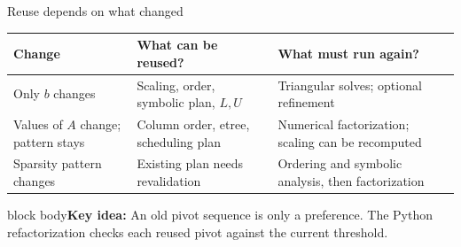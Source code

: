 \documentclass[aspectratio=169,10pt]{beamer}
\newcommand{\takeaway}[1]{\vfill\begin{beamercolorbox}[sep=7pt,wd=\textwidth]{block body}\small\textbf{Key idea:} #1\end{beamercolorbox}}
\begin{document}
\begin{frame}{Reuse depends on what changed}
\centering
\begin{tabular}{@{}p{3.5cm}p{4.9cm}p{4.9cm}@{}}
\toprule
\textbf{Change} & \textbf{What can be reused?} & \textbf{What must run again?}\\
\midrule
Only $b$ changes & Scaling, order, symbolic plan, $L,U$ & Triangular solves; optional refinement\\[9pt]
Values of $A$ change; pattern stays & Column order, etree, scheduling plan & Numerical factorization; scaling can be recomputed\\[9pt]
Sparsity pattern changes & Existing plan needs revalidation & Ordering and symbolic analysis, then factorization\\
\bottomrule
\end{tabular}
\vspace{.35cm}
\takeaway{An old pivot sequence is only a preference. The Python refactorization checks each reused pivot against the current threshold.}
\end{frame}
\end{document}
